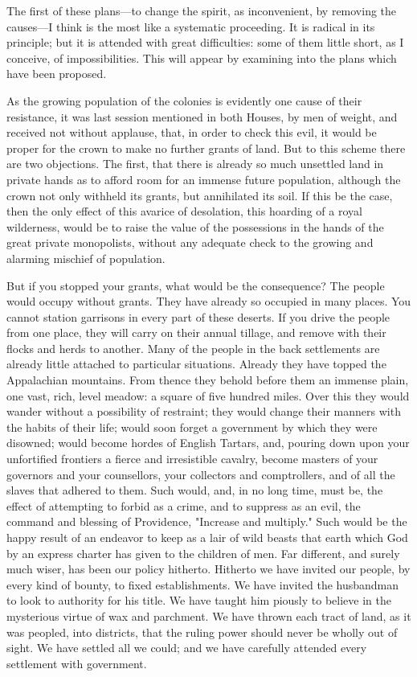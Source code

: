 The first of these plans—to change the spirit, as inconvenient, by removing the causes—I think is the most like a systematic proceeding. It is radical in its principle; but it is attended with great difficulties: some of them little short, as I conceive, of impossibilities. This will appear by examining into the plans which have been proposed.

As the growing population of the colonies is evidently one cause of their resistance, it was last session mentioned in both Houses, by men of weight, and received not without applause, that, in order to check this evil, it would be proper for the crown to make no further grants of land. But to this scheme there are two objections. The first, that there is already so much unsettled land in private hands as to afford room for an immense future population, although the crown not only withheld its grants, but annihilated its soil. If this be the case, then the only effect of this avarice of desolation, this hoarding of a royal wilderness, would be to raise the value of the possessions in the hands of the great private monopolists, without any adequate check to the growing and alarming mischief of population.

But if you stopped your grants, what would be the consequence? The people would occupy without grants. They have already so occupied in many places. You cannot station garrisons in every part of these deserts. If you drive the people from one place, they will carry on their annual tillage, and remove with their flocks and herds to another. Many of the people in the back settlements are already little attached to particular situations. Already they have topped the Appalachian mountains. From thence they behold before them an immense plain, one vast, rich, level meadow: a square of five hundred miles. Over this they would wander without a possibility of restraint; they would change their manners with the habits of their life; would soon forget a government by which they were disowned; would become hordes of English Tartars, and, pouring down upon your unfortified frontiers a fierce and irresistible cavalry, become masters of your governors and your counsellors, your collectors and comptrollers, and of all the slaves that adhered to them. Such would, and, in no long time, must be, the effect of attempting to forbid as a crime, and to suppress as an evil, the command and blessing of Providence, "Increase and multiply." Such would be the happy result of an endeavor to keep as a lair of wild beasts that earth which God by an express charter has given to the children of men. Far different, and surely much wiser, has been our policy hitherto. Hitherto we have invited our people, by every kind of bounty, to fixed establishments. We have invited the husbandman to look to authority for his title. We have taught him piously to believe in the mysterious virtue of wax and parchment. We have thrown each tract of land, as it was peopled, into districts, that the ruling power should never be wholly out of sight. We have settled all we could; and we have carefully attended every settlement with government.

